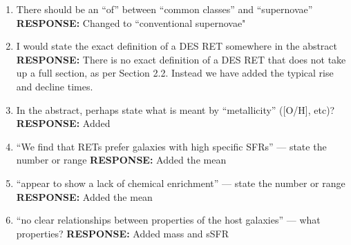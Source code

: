 \documentclass{article}
\begin{document}
\begin{enumerate}
\item There should be an “of” between “common classes” and “supernovae”
\vskip0.1cm
{\bf RESPONSE: } Changed to ``conventional supernovae"

\item I would state the exact definition of a DES RET somewhere in the abstract
\vskip0.1cm
{\bf RESPONSE: } There is no exact definition of a DES RET that does not take up a full section, as per Section 2.2. Instead we have added the typical rise and decline times.

\item In the abstract, perhaps state what is meant by “metallicity” ([O/H], etc)?
\vskip0.1cm
{\bf RESPONSE: } Added 

\item “We find that RETs prefer galaxies with high specific SFRs” — state the number or range
\vskip0.1cm
{\bf RESPONSE: } Added the mean

\item “appear to show a lack of chemical enrichment” — state the number or range
\vskip0.1cm
{\bf RESPONSE: } Added the mean

\item “no clear relationships between properties of the host galaxies” — what properties?
\vskip0.1cm
{\bf RESPONSE: } Added mass and sSFR 

\end{enumerate}
\end{document}
